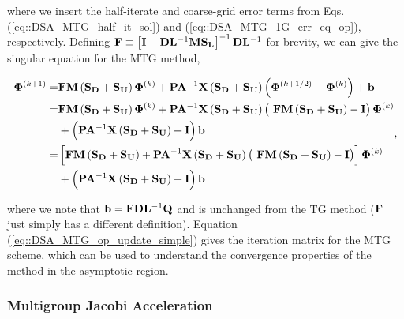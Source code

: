 \noindent where we insert the half-iterate and coarse-grid error terms from Eqs. (\ref{eq::DSA_MTG_half_it_sol}) and (\ref{eq::DSA_MTG_1G_err_eq_op}), respectively. Defining ${\bf F} \equiv \left[ {\bf I} - {\bf D}{\bf L}^{-1} {\bf M}{\bf S_L}\right]^{-1} {\bf D}{\bf L}^{-1} $ for brevity, we can give the singular equation for the MTG method,

\begin{equation}
\label{eq::DSA_MTG_op_update_simple}
\begin{aligned}
 {\bf \Phi}^{(k+1)} =  &{\bf F}  {\bf M} \left( {\bf S_{D}} + {\bf S_{U}} \right) {\bf \Phi}^{(k)} +  {\bf P} {\bf A}^{-1}  {\bf X} \left( {\bf S_{D}} + {\bf S_{U}} \right) \left(  {\bf \Phi}^{(k+1/2)} - {\bf \Phi}^{(k)}  \right) + {\bf b} \\
= &{\bf F}  {\bf M}\left( {\bf S_{D}} + {\bf S_{U}} \right) {\bf \Phi}^{(k)} +  {\bf P} {\bf A}^{-1}  {\bf X} \left( {\bf S_{D}} + {\bf S_{U}} \right) \left(  \ {\bf F}  {\bf M}\left( {\bf S_{D}} + {\bf S_{U}} \right)  -  {\bf I} \right){\bf \Phi}^{(k)} \\
&+ \left(  {\bf P} {\bf A}^{-1}  {\bf X} \left( {\bf S_{D}} + {\bf S_{U}} \right)  + {\bf I} \right) {\bf b} \\
= &\left[ {\bf F}  {\bf M} \left( {\bf S_{D}} + {\bf S_{U}} \right) +  {\bf P} {\bf A}^{-1}  {\bf X} \left( {\bf S_{D}} + {\bf S_{U}} \right) \left(  \ {\bf F}  {\bf M} \left( {\bf S_{D}} + {\bf S_{U}} \right)  -  {\bf I} \right) \right] {\bf \Phi}^{(k)} \\
&+ \left(  {\bf P} {\bf A}^{-1}  {\bf X} \left( {\bf S_{D}} + {\bf S_{U}} \right)  + {\bf I} \right) {\bf b}
\end{aligned} ,
\end{equation}

\noindent where we note that ${\bf b}={\bf F} {\bf D}{\bf L}^{-1}  {\bf Q}$ and is unchanged from the TG method (${\bf F}$ just simply has a different definition). Equation (\ref{eq::DSA_MTG_op_update_simple}) gives the iteration matrix for the MTG scheme, which can be used to understand the convergence properties of the method in the asymptotic region. 

\subsubsection{Multigroup Jacobi Acceleration}
\label{sec:DSA_DSA_MG_WGS}


